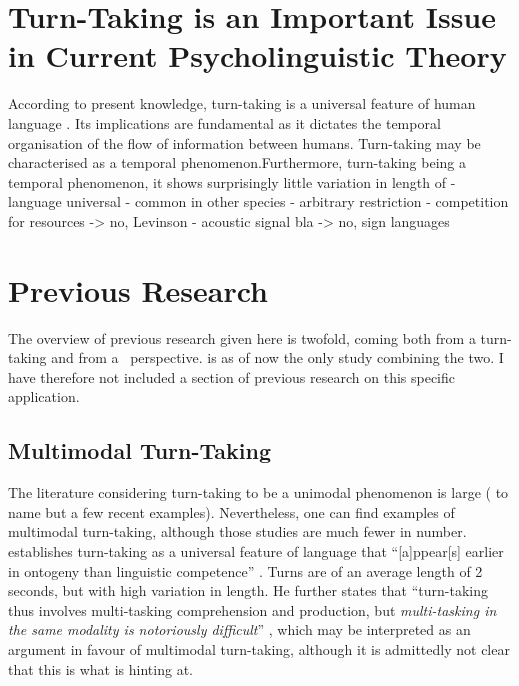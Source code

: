 \section{Turn-Taking is an Important Issue in Current Psycholinguistic Theory}
According to present knowledge, turn-taking is a universal feature of human language \citep[]{levinson_turn-taking_2016}. Its implications are fundamental as it dictates the temporal organisation of the flow of information between humans. Turn-taking may be characterised as a temporal phenomenon.Furthermore, turn-taking being a temporal phenomenon, it shows surprisingly little variation in length of 
- language universal
- common in other species
- arbitrary restriction
	- competition for resources -> no, Levinson
	- acoustic signal bla -> no, sign languages




\section{Previous Research}
\label{sec:introductionresearch}
The overview of previous research given here is twofold, coming both from a turn-taking and from a \fpmlower\ perspective.
\citet{rohlfing_multimodal_nodate} is as of now the only study combining the two.
I have therefore not included a section of previous research on this specific application.


\subsection{Multimodal Turn-Taking}
\label{sec:introductionresearchturntaking}
The literature considering turn-taking to be a unimodal phenomenon is large (\citep{casillas_turn-taking_2016,freud_turn-taking_2016,heldner_pauses_2010} to name but a few recent examples).
Nevertheless, one can find examples of multimodal turn-taking, although those studies are much fewer in number.
\citet{levinson_turn-taking_2016} establishes turn-taking as a universal feature of language that ``[a]ppear[s] earlier in ontogeny than linguistic competence'' \citep[]{levinson_turn-taking_2016}.
Turns are of an average length of 2 seconds, but with high variation in length.
He further states that ``turn-taking thus involves multi-tasking comprehension and production, but \emph{multi-tasking in the same modality is notoriously difficult}'' \citep[, emphasis mine]{levinson_turn-taking_2016}, which may be interpreted as an argument in favour of multimodal turn-taking, although it is admittedly not clear that this is what \citeauthor{levinson_turn-taking_2016} is hinting at.%

